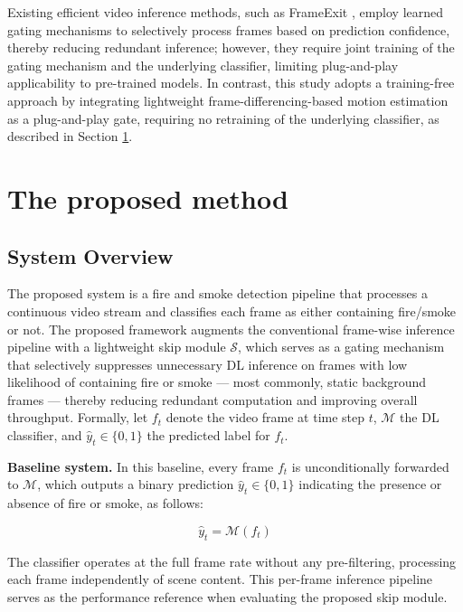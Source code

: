 \documentclass[
  10pt,
]{article}
\begin{document}
Existing efficient video inference methods, such as FrameExit
, employ learned gating
mechanisms to selectively process frames based on prediction confidence,
thereby reducing redundant inference; however, they require joint
training of the gating mechanism and the underlying classifier, limiting
plug-and-play applicability to pre-trained models. In contrast, this
study adopts a training-free approach by integrating lightweight
frame-differencing-based motion estimation as a plug-and-play gate,
requiring no retraining of the underlying classifier, as described in
Section \ref{sec:method}.

\section{The proposed method}\label{sec:method}

\subsection{System Overview}\label{system-overview}



The proposed system is a fire and smoke detection pipeline that
processes a continuous video stream and classifies each frame as either
containing fire/smoke or not. The proposed framework augments the
conventional frame-wise inference pipeline with a lightweight skip
module \(\mathcal{S}\), which serves as a gating mechanism that
selectively suppresses unnecessary DL inference on frames with low
likelihood of containing fire or smoke --- most commonly, static
background frames --- thereby reducing redundant computation and
improving overall throughput. Formally, let \(f_t\) denote the video
frame at time step \(t\), \(\mathcal{M}\) the DL classifier, and
\(\hat{y}_t \in \{0, 1\}\) the predicted label for \(f_t\).

\textbf{Baseline system.} In this baseline, every frame \(f_t\) is
unconditionally forwarded to \(\mathcal{M}\), which outputs a binary
prediction \(\hat{y}_t \in
\{0, 1\}\) indicating the presence or absence of fire or smoke, as
follows:

\[\hat{y}_t = \mathcal{M}(f_t)\]

The classifier operates at the full frame rate without any
pre-filtering, processing each frame independently of scene content.
This per-frame inference pipeline serves as the performance reference
when evaluating the proposed skip module.
\end{document}
